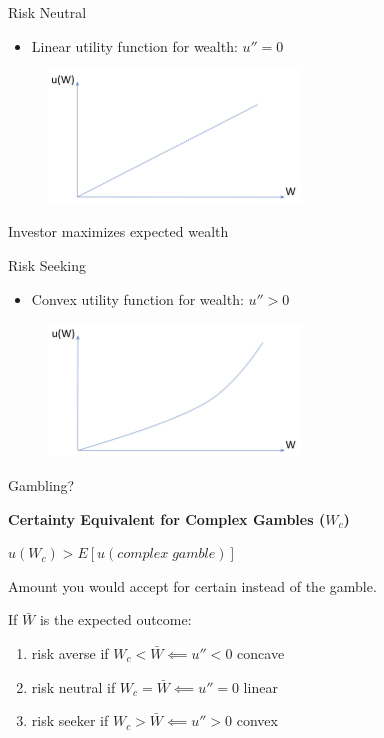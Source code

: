 \documentclass[
14pt,notheorems,hyperref={pdfauthor=whatever}
]{beamer}
\begin{document}
\begin{frame}
Risk Neutral\\
\hfill \break
\begin{itemize}
    \item Linear utility function for wealth: $u''=0$
\end{itemize}
\begin{figure}[l1-rn]
    \includegraphics[width=0.6\textwidth]{L1-riskneutral}
    \centering
\end{figure}
Investor maximizes expected wealth\\
\end{frame}

\begin{frame}
Risk Seeking\\
\hfill \break
\begin{itemize}
    \item Convex utility function for wealth: $u''>0$
\end{itemize}
\begin{figure}[l1-rs]
    \includegraphics[width=0.6\textwidth]{L1-riskseeker}
    \centering
\end{figure}
Gambling?\\
\end{frame}

\begin{frame}
\textbf{Certainty Equivalent for Complex Gambles ($W_c$)}\\
\begin{center}
    $u(W_c) > E[u(complex\;gamble)]$\\
\end{center}
\begin{center}
    Amount you would accept for certain instead of the gamble.
\end{center}
\hfill \break
If $\bar{W}$ is the expected outcome:\\
\begin{enumerate}
\setlength{\itemindent}{.5in}
    \item risk averse if $W_c < \bar{W} \impliedby u''<0$  concave
    \item risk neutral if $W_c = \bar{W} \impliedby u''=0$  linear
    \item risk seeker if $W_c > \bar{W} \impliedby u''>0$  convex
\end{enumerate}
\end{frame}
\end{document}
